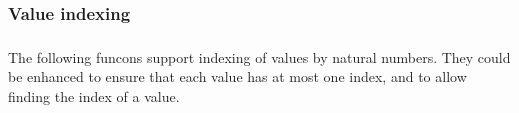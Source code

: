 \subsubsection*{Value indexing}\hypertarget{value-indexing}{}\label{value-indexing}

\begin{align*}
  [ ~ 
  \KEY{Entity} ~ & \NAMEREF{value-index} \\
  \KEY{Funcon} ~ & \NAMEREF{initialise-index} \\
  \KEY{Funcon} ~ & \NAMEREF{allocate-index} \\
  \KEY{Funcon} ~ & \NAMEREF{lookup-index}
  ~ ]
\end{align*}
The following funcons support indexing of values by natural numbers.
They could be enhanced to ensure that each value has at most one index,
and to allow finding the index of a value.

